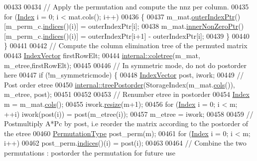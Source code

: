 \begin{DoxyCode}
00433     
00434     \textcolor{comment}{// Apply the permutation and compute the nnz per column.}
00435     \textcolor{keywordflow}{for} (\hyperlink{namespace_eigen_a62e77e0933482dafde8fe197d9a2cfde}{Index} i = 0; i < mat.cols(); i++)
00436     \{
00437       m\_mat.\hyperlink{group___sparse_core___module_a75506964d86d6badb32d0b4917acf2e2}{outerIndexPtr}()[m\_perm\_c.\hyperlink{group___core___module_a2f1ab379207fcd1ceb33941e25cf50c2}{indices}()(i)] = outerIndexPtr[i];
00438       m\_mat.\hyperlink{group___sparse_core___module_a218204b051a24f579c394454786eeda0}{innerNonZeroPtr}()[m\_perm\_c.\hyperlink{group___core___module_a2f1ab379207fcd1ceb33941e25cf50c2}{indices}()(i)] = outerIndexPtr[i+1] - 
      outerIndexPtr[i];
00439     \}
00440   \}
00441   
00442   \textcolor{comment}{// Compute the column elimination tree of the permuted matrix }
00443   \hyperlink{group___core___module}{IndexVector} firstRowElt;
00444   \hyperlink{namespace_eigen_1_1internal_a86181db74ba596a7afbfd89efcc5788c}{internal::coletree}(m\_mat, m\_etree,firstRowElt); 
00445      
00446   \textcolor{comment}{// In symmetric mode, do not do postorder here}
00447   \textcolor{keywordflow}{if} (!m\_symmetricmode) \{
00448     \hyperlink{group___core___module}{IndexVector} post, iwork; 
00449     \textcolor{comment}{// Post order etree}
00450     \hyperlink{namespace_eigen_1_1internal_ab414b5990bd6c865958a9231ff418d20}{internal::treePostorder}(StorageIndex(m\_mat.\hyperlink{group___sparse_core___module_aa391750e3c530227e4a5c3c52e959975}{cols}()), m\_etree, post); 
00451       
00452    
00453     \textcolor{comment}{// Renumber etree in postorder }
00454     \hyperlink{namespace_eigen_a62e77e0933482dafde8fe197d9a2cfde}{Index} m = m\_mat.\hyperlink{group___sparse_core___module_aa391750e3c530227e4a5c3c52e959975}{cols}(); 
00455     iwork.\hyperlink{class_eigen_1_1_plain_object_base_a99d9054ee2d5a40c6e00ded0265e9cea}{resize}(m+1);
00456     \textcolor{keywordflow}{for} (\hyperlink{namespace_eigen_a62e77e0933482dafde8fe197d9a2cfde}{Index} i = 0; i < m; ++i) iwork(post(i)) = post(m\_etree(i));
00457     m\_etree = iwork;
00458     
00459     \textcolor{comment}{// Postmultiply A*Pc by post, i.e reorder the matrix according to the postorder of the etree}
00460     \hyperlink{group___core___module}{PermutationType} post\_perm(m); 
00461     \textcolor{keywordflow}{for} (\hyperlink{namespace_eigen_a62e77e0933482dafde8fe197d9a2cfde}{Index} i = 0; i < m; i++) 
00462       post\_perm.\hyperlink{group___core___module_a2f1ab379207fcd1ceb33941e25cf50c2}{indices}()(i) = post(i); 
00463         
00464     \textcolor{comment}{// Combine the two permutations : postorder the permutation for future use}

\end{DoxyCode}
